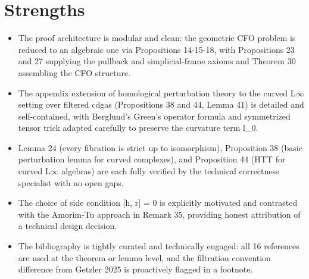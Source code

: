 \documentclass[11pt]{article}
\begin{document}
\section*{Strengths}
\begin{itemize}[leftmargin=*]
  \item The proof architecture is modular and clean: the geometric CFO problem is reduced to an algebraic one via Propositions 14-15-18, with Propositions 23 and 27 supplying the pullback and simplicial-frame axioms and Theorem 30 assembling the CFO structure.
  \item The appendix extension of homological perturbation theory to the curved L\ensuremath{\infty} setting over filtered cdgas (Propositions 38 and 44, Lemma 41) is detailed and self-contained, with Berglund's Green's operator formula and symmetrized tensor trick adapted carefully to preserve the curvature term l\_0.
  \item Lemma 24 (every fibration is strict up to isomorphism), Proposition 38 (basic perturbation lemma for curved complexes), and Proposition 44 (HTT for curved L\ensuremath{\infty} algebras) are each fully verified by the technical correctness specialist with no open gaps.
  \item The choice of side condition [h, r] = 0 is explicitly motivated and contrasted with the Amorim-Tu approach in Remark 35, providing honest attribution of a technical design decision.
  \item The bibliography is tightly curated and technically engaged: all 16 references are used at the theorem or lemma level, and the filtration convention difference from Getzler 2025 is proactively flagged in a footnote.
\end{itemize}
\end{document}
